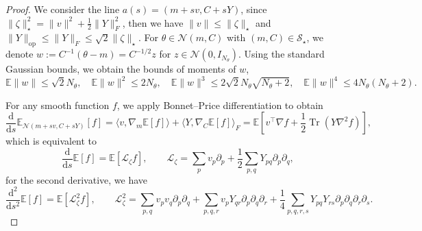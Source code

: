 \documentclass[11pt]{article}
\theoremstyle{plain}
\theoremstyle{definition}
\theoremstyle{remark}
\newcommand{\N}{\mathcal{N}}
\newcommand{\E}{\mathbb{E}}
\newcommand{\Tr}{\operatorname{Tr}}
\newcommand{\dd}{\mathrm{d}}
\begin{document}
\begin{proof}
    We consider the line $a(s) = (m + sv, C + sY)$, since $\|\zeta\|_\star^2 = \|v\|^2 + \frac{1}{2} \|Y\|_F^2$, then we have $\|v\| \leq \|\zeta\|_\star$ and $\|Y\|_\mathrm{op} \leq \|Y\|_F \leq \sqrt{2} \|\zeta\|_\star$. For $\theta \in \N (m, C)$ with $(m, C) \in \mathcal{S}_\star$, we denote $w := C^{-1} (\theta - m) = C^{-1/2} z$ for $z \in \N(0, I_{N_\theta})$. Using the standard Gaussian bounds, we obtain the bounds of moments of $w$,
    \begin{equation*}
        \E\|w\| \leq \sqrt{2} N_\theta, \quad \E\|w\|^2 \leq 2 N_\theta, \quad \E\|w\|^3 \leq 2\sqrt{2} N_\theta \sqrt{N_\theta + 2}, \quad \E\|w\|^4 \leq 4 N_\theta (N_\theta + 2).
    \end{equation*}

    For any smooth function $f$, we apply Bonnet--Price differentiation to obtain
    \begin{equation*}
        \frac{\dd}{\dd s} \E_{\N(m + sv, C + sY)} [f] = \langle v, \nabla_m \E[f] \rangle + \langle Y, \nabla_C \E[f] \rangle_F = \E \left[ v^\top \nabla f + \frac{1}{2} \Tr(Y \nabla^2 f) \right],
    \end{equation*}
    which is equivalent to 
    \begin{equation*}
        \frac{\dd}{\dd s} \E[f] = \E[\mathcal{L}_\zeta f], \qquad \mathcal{L}_\zeta = \sum_p v_p \partial_p + \frac{1}{2} \sum_{p,q} Y_{pq} \partial_p \partial_q,
    \end{equation*}
    for the second derivative, we have
    \begin{equation*}
        \frac{\dd^2}{\dd s^2} \E[f] = \E[\mathcal{L}_\zeta^2 f], \qquad \mathcal{L}_\zeta^2 = \sum_{p, q} v_p v_q \partial_p \partial_q + \sum_{p, q, r} v_p Y_{qr} \partial_p \partial_q \partial_r + \frac{1}{4} \sum_{p, q, r, s} Y_{pq} Y_{rs} \partial_p \partial_q \partial_r \partial_s.
    \end{equation*}
    

\end{proof}
\end{document}
